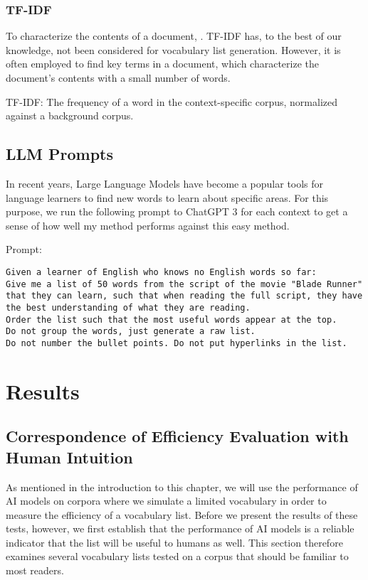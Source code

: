 \subsubsection{TF-IDF}
To characterize the contents of a document, \cite{qaiserTextMiningUse2018}.
TF-IDF has, to the best of our knowledge, not been considered for vocabulary list generation.
However, it is often employed to find key terms in a document, which characterize the document's contents with a small number of words.

TF-IDF: The frequency of a word in the context-specific corpus, normalized against a background corpus.

\subsection{LLM Prompts}
In recent years, Large Language Models have become a popular tools for language learners to find new words to learn about specific areas.
For this purpose, we run the following prompt to ChatGPT 3 for each context to get a sense of how well my method performs against this easy method.

Prompt:

\begin{lstlisting}[caption={Prompt given to the language model.}, label={lst:blade_runner_prompt}, captionpos=b]
	Given a learner of English who knows no English words so far:
Give me a list of 50 words from the script of the movie "Blade Runner" that they can learn, such that when reading the full script, they have the best understanding of what they are reading.
Order the list such that the most useful words appear at the top.
Do not group the words, just generate a raw list.
Do not number the bullet points. Do not put hyperlinks in the list.

\end{lstlisting}

\section{Results} \label{sec:results}

\subsection{Correspondence of Efficiency Evaluation with Human Intuition}
As mentioned in the introduction to this chapter, we will use the performance of AI models on corpora where we simulate a limited vocabulary in order to measure the efficiency of a vocabulary list.
Before we present the results of these tests, however, we first establish that the performance of AI models is a reliable indicator that the list will be useful to humans as well.
This section therefore examines several vocabulary lists tested on a corpus that should be familiar to most readers.

